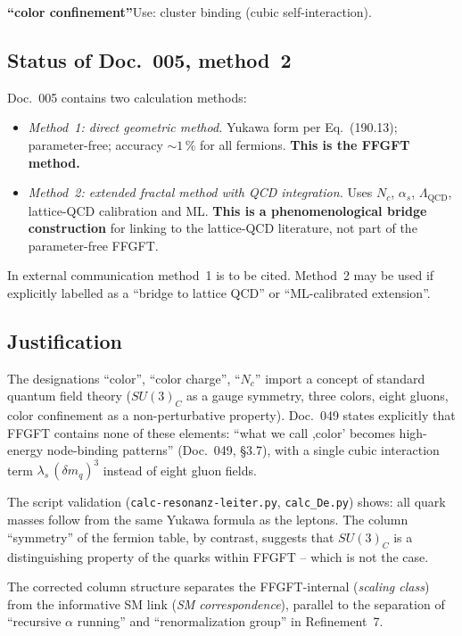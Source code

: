 \smallskip\noindent \textbf{\enquote{color confinement}}\quad Use: cluster binding (cubic self-interaction).

\medskip


\subsection*{Status of Doc.~005, method~2}

Doc.~005 contains two calculation methods:
\begin{itemize}
  \item \emph{Method~1: direct geometric method.} Yukawa form per
        Eq.~(190.13); parameter-free; accuracy $\sim 1\,\%$ for all fermions.
        \textbf{This is the FFGFT method.}
  \item \emph{Method~2: extended fractal method with QCD integration.} Uses
        $N_c$, $\alpha_s$, $\Lambda_{\text{QCD}}$, lattice-QCD calibration and
        ML. \textbf{This is a phenomenological bridge construction} for linking
        to the lattice-QCD literature, not part of the parameter-free FFGFT.
\end{itemize}

In external communication method~1 is to be cited. Method~2 may be used if
explicitly labelled as a \enquote{bridge to lattice QCD} or
\enquote{ML-calibrated extension}.

\subsection*{Justification}

The designations \enquote{color}, \enquote{color charge}, \enquote{$N_c$}
import a concept of standard quantum field theory ($SU(3)_C$ as a gauge
symmetry, three colors, eight gluons, color confinement as a non-perturbative
property). Doc.~049 states explicitly that FFGFT contains none of these
elements: \enquote{what we call ,color' becomes high-energy node-binding
patterns} (Doc.~049, §3.7), with a single cubic interaction term
$\lambda_s\,(\delta m_q)^3$ instead of eight gluon fields.

The script validation (\texttt{calc-resonanz-leiter.py}, \texttt{calc\_De.py})
shows: all quark masses follow from the same Yukawa formula as the leptons. The
column \enquote{symmetry} of the fermion table, by contrast, suggests that
$SU(3)_C$ is a distinguishing property of the quarks within FFGFT -- which is
not the case.

The corrected column structure separates the FFGFT-internal
(\emph{scaling class}) from the informative SM link (\emph{SM correspondence}),
parallel to the separation of \enquote{recursive $\alpha$ running} and
\enquote{renormalization group} in Refinement~7.

